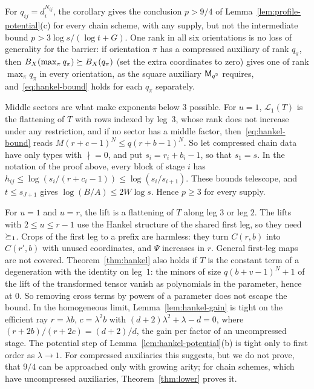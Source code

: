 For \(q_{ij}=d_i^{N_{ij}}\), the corollary gives the conclusion
\(p>9/4\) of Lemma~\ref{lem:profile-potential}(c) for every chain scheme,
with any supply, but not the intermediate bound
\(p>3\log s/(\log t+G)\). One rank in all six orientations is no loss of
generality for the barrier: if orientation \(\pi\) has a compressed
auxiliary of rank \(q_\pi\), then \(B_X(\max_\pi q_\pi)\succeq B_X(q_\pi)\)
(set the extra coordinates to zero) gives one of rank \(\max_\pi q_\pi\)
in every orientation, as the square auxiliary \(\mathsf M_{q^2}\) requires,
and~\eqref{eq:hankel-bound} holds for each \(q_\pi\) separately.

\begin{remark}\label{rem:ordinary-only}
Middle sectors are what make exponents below \(3\) possible. For
\(u=1\), \(\mathcal L_1(T)\) is the flattening of \(T\) with rows indexed
by leg~\(3\), whose rank does not increase under any restriction, and if
no sector has a middle factor, then~\eqref{eq:hankel-bound} reads
\(M(r+c-1)^N\le q(r+b-1)^N\). So let compressed chain data have only
types with \(\nmid=0\), and put \(s_i=r_i+b_i-1\), so that \(s_1=s\). In
the notation of the proof above, every block of stage \(i\) has
\(h_{ij}\le\log(s_i/(r+c_i-1))\le\log(s_i/s_{i+1})\). These bounds
telescope, and
\(t\le s_{J+1}\) gives \(\log(B/A)\le2W\log s\). Hence \(p\ge3\) for
every supply.
\end{remark}

\begin{remark}\label{rem:hankel-remarks}
For \(u=1\) and \(u=r\), the lift is a flattening of \(T\) along leg
\(3\) or leg \(2\). The lifts with \(2\le u\le r-1\) use the Hankel
structure of the shared first leg, so they need \(\succeq_1\). Crops of
the first leg to a prefix are harmless: they turn \(C(r,b)\) into
\(C(r',b)\) with unused coordinates, and \(\Psi\) increases in \(r\).
General first-leg maps are not covered. Theorem~\ref{thm:hankel} also
holds if \(T\) is the constant term of a degeneration with the identity
on leg~\(1\): the minors of size \(q(b+v-1)^N+1\) of the lift of the
transformed tensor vanish as polynomials in the parameter, hence at
\(0\). So removing cross terms by powers of a parameter does not escape
the bound. In the homogeneous limit, Lemma~\ref{lem:hankel-gain} is
tight on the efficient ray \(r=\lambda b\), \(c=\lambda^2b\) with
\((d+2)\lambda^2+\lambda-d=0\), where \((r+2b)/(r+2c)=(d+2)/d\), the gain
per factor of an uncompressed stage. The potential step of
Lemma~\ref{lem:hankel-potential}(b) is tight only to first order as
\(\lambda\to1\). For compressed auxiliaries this suggests, but we do not
prove, that \(9/4\) can be approached only with growing arity; for chain
schemes, which have uncompressed auxiliaries, Theorem~\ref{thm:lower}
proves it.
\end{remark}


